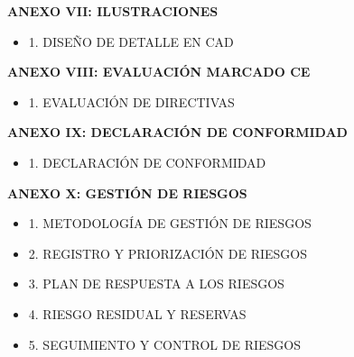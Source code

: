 \documentclass[11pt,a4paper]{article}
\begin{document}
\begin{description}[style=nextline, leftmargin=0.5cm, font=\bfseries\color{ArthroNavy}]
\begin{itemize}[label=\color{ArthroGray}\circ, leftmargin=0.5cm, itemsep=0.2em, topsep=0.1cm]
        \end{itemize}
        
        \item \textbf{ANEXO VII: ILUSTRACIONES} 
        \begin{itemize}[label=\color{ArthroGray}\circ, leftmargin=0.5cm, itemsep=0.2em, topsep=0.1cm]
            \small
            \item 1. DISEÑO DE DETALLE EN CAD 
           
        \end{itemize}
        
        \item \textbf{ANEXO VIII: EVALUACIÓN MARCADO CE} 
        \begin{itemize}[label=\color{ArthroGray}\circ, leftmargin=0.5cm, itemsep=0.2em, topsep=0.1cm]
            \small
            \item 1. EVALUACIÓN DE DIRECTIVAS  
            
        \end{itemize}
        
        \item \textbf{ANEXO IX: DECLARACIÓN DE CONFORMIDAD} 
        \begin{itemize}[label=\color{ArthroGray}\circ, leftmargin=0.5cm, itemsep=0.2em, topsep=0.1cm]
            \small
            \item 1. DECLARACIÓN DE CONFORMIDAD 
            
        \end{itemize}
        
        \item \textbf{ANEXO X: GESTIÓN DE RIESGOS} 
        \begin{itemize}[label=\color{ArthroGray}\circ, leftmargin=0.5cm, itemsep=0.2em, topsep=0.1cm]
            \small
            \item 1. METODOLOGÍA DE GESTIÓN DE RIESGOS 
            \item 2. REGISTRO Y PRIORIZACIÓN DE RIESGOS
            \item 3. PLAN DE RESPUESTA A LOS RIESGOS
            \item 4. RIESGO RESIDUAL Y RESERVAS 
            \item 5. SEGUIMIENTO Y CONTROL DE RIESGOS 
        \end{itemize}
        

\end{description}
\end{document}
